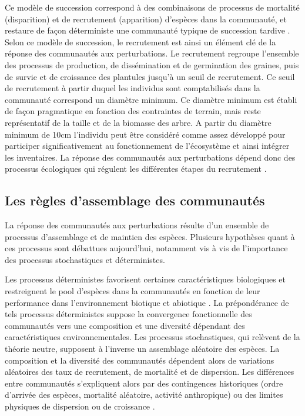 \documentclass[
  11pt,
  french,
  A4paper,
  extrafontsizes,onecolumn,openright
  ]{memoir}
\begin{document}
Ce modèle de succession correspond à des combinaisons de processus de
mortalité (disparition) et de recrutement (apparition) d'espèces dans la
communauté, et restaure de façon déterministe une communauté typique de
succession tardive \autocite{Denslow2000}. Selon ce modèle de
succession, le recrutement est ainsi un élément clé de la réponse des
communautés aux perturbations. Le recrutement regroupe l'ensemble des
processus de production, de dissémination et de germination des graines,
puis de survie et de croissance des plantules jusqu'à un seuil de
recrutement. Ce seuil de recrutement à partir duquel les individus sont
comptabilisés dans la communauté correspond un diamètre minimum. Ce
diamètre minimum est établi de façon pragmatique en fonction des
contraintes de terrain, mais reste représentatif de la taille et de la
biomasse des arbre. A partir du diamètre minimum de 10cm l'individu peut
être considéré comme assez développé pour participer significativement
au fonctionnement de l'écosystème et ainsi intégrer les inventaires. La
réponse des communautés aux perturbations dépend donc des processus
écologiques qui régulent les différentes étapes du recrutement
\autocites{Denslow1980}{Schnitzer2001}{Asner2004}.

\subsection{Les règles d'assemblage des
communautés}\label{les-regles-dassemblage-des-communautes}

La réponse des communautés aux perturbations résulte d'un ensemble de
processus d'assemblage et de maintien des espèces. Plusieurs hypothèses
quant à ces processus sont débattues aujourd'hui, notamment vis à vis de
l'importance des processus stochastiques et déterministes.

Les processus déterministes favorisent certaines caractéristiques
biologiques et restreignent le pool d'espèces dans la communautés en
fonction de leur performance dans l'environnement biotique et abiotique
\autocite{Molino2001}. La prépondérance de tels processus déterministes
suppose la convergence fonctionnelle des communautés vers une
composition et une diversité dépendant des caractéristiques
environnementales. Les processus stochastiques, qui relèvent de la
théorie neutre, supposent à l'inverse un assemblage aléatoire des
espèces. La composition et la diversité des communautés dépendent alors
de variations aléatoires des taux de recrutement, de mortalité et de
dispersion. Les différences entre communautés s'expliquent alors par des
contingences historiques (ordre d'arrivée des espèces, mortalité
aléatoire, activité anthropique) ou des limites physiques de dispersion
ou de croissance \autocites{Hubbell2001}{Adler2007}.
\end{document}
